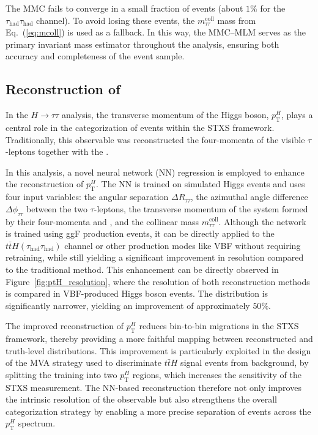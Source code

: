 The MMC fails to converge in a small fraction of events (about $1\%$ for the $\tau_{\text{had}}\tau_{\text{had}}$ channel). To avoid losing these events, the $m_{\tau\tau}^{\text{coll}}$ mass from Eq.~(\ref{eq:mcoll}) is used as a fallback. In this way, the MMC–MLM serves as the primary invariant mass estimator throughout the analysis, ensuring both accuracy and completeness of the event sample.  

\subsection{Reconstruction of \pth}
\label{subsec:higgs_mass}

In the $H \to \tau\tau$ analysis, the transverse momentum of the Higgs boson, $p_{\text{T}}^H$, plays a central role in the categorization of events within the STXS framework. Traditionally, this observable was reconstructed the four-momenta of the visible $\tau$-leptons together with the \etmiss.

In this analysis, a novel neural network (NN) regression is employed to enhance the reconstruction of $p_{\text{T}}^H$. The NN is trained on simulated Higgs events and uses four input variables: the angular separation $\Delta R_{\tau\tau}$, the azimuthal angle difference $\Delta \phi_{\tau\tau}$ between the two $\tau$-leptons, the transverse momentum of the system formed by their four-momenta and \etmiss, and the collinear mass $m_{\tau\tau}^{\text{coll}}$. Although the network is trained using ggF production events, it can be directly applied to the $t\bar{t}H(\tau_{\text{had}}\tau_{\text{had}})$ channel or other production modes like VBF without requiring retraining, while still yielding a significant improvement in resolution compared to the traditional method.
This enhancement can be directly observed in Figure~\ref{fig:ptH_resolution}, where the resolution of both reconstruction methods is compared in VBF-produced Higgs boson events. The distribution is significantly narrower, yielding an improvement of approximately $50\%$.

The improved reconstruction of $p_{\text{T}}^H$ reduces bin-to-bin migrations in the STXS framework, thereby providing a more faithful mapping between reconstructed and truth-level distributions. This improvement is particularly exploited in the design of the MVA strategy used to discriminate $t\bar{t}H$ signal events from background, by splitting the training into two $p_{\text{T}}^H$ regions, which increases the sensitivity of the STXS measurement. The NN-based reconstruction therefore not only improves the intrinsic resolution of the observable but also strengthens the overall categorization strategy by enabling a more precise separation of events across the $p_{\text{T}}^H$ spectrum.

